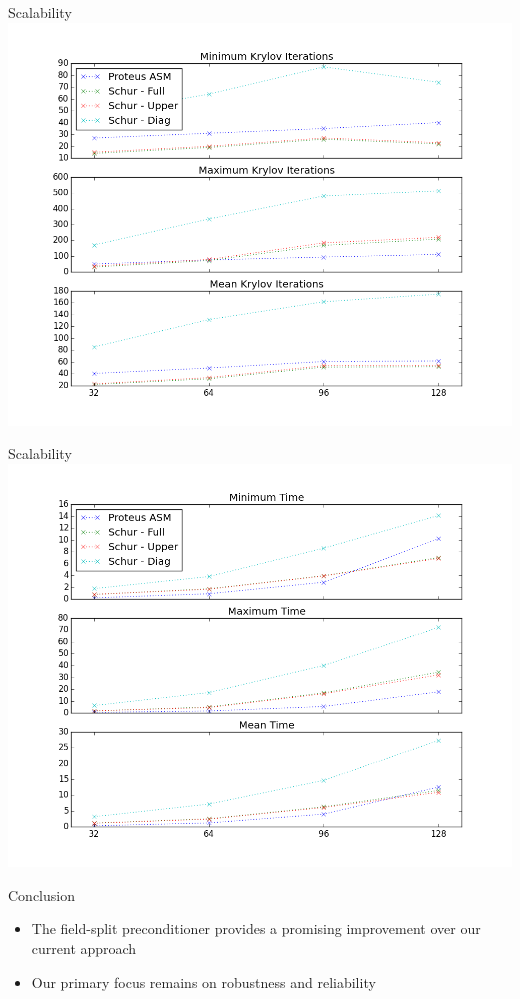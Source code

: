 \documentclass{beamer}
\begin{document}
\begin{frame}{Scalability}
    \includegraphics[width=\textwidth]{figures/marin_iterations_scalability.png}
\end{frame}

\begin{frame}{Scalability}
    \includegraphics[width=\textwidth]{figures/marin_time_scalability.png}
\end{frame}

\begin{frame}{Conclusion}
  \begin{itemize}
  \item The field-split preconditioner provides a promising improvement
    over our current approach
  \item Our primary focus remains on robustness and reliability
  \end{itemize}
\end{frame}
\end{document}
